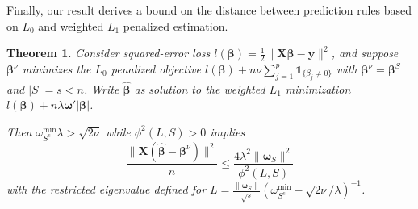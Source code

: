 \documentclass[12pt]{article}
\newtheorem{theorem}{\sc Theorem}[section]
\newcommand{\bs}[1]{\boldsymbol{#1}}
\newcommand{\mr}[1]{\mathrm{#1}}
\newcommand{\bm}[1]{\mathbf{#1}}
\newcommand{\ds}[1]{\mathds{#1}}
\begin{document}
Finally, our result derives a bound on the distance between prediction rules based on $L_0$ and weighted $L_1$ penalized estimation.
\begin{theorem} \label{sparseapprox}  Consider squared-error loss $l(\bs{\beta}) =
\frac{1}{2}\|\bm{X}\bs{\beta}-\bm{y}\|^2$, and suppose $\bs{\beta}^{\nu}$ minimizes the $L_0$ penalized objective $l(\bs{\beta}) + n\nu\sum_{j=1}^p\ds{1}_{\{\beta_j\neq0\}}$ with $\bs{\beta}^\nu = \bs{\beta}^S$ and $|S|=s<n$.   
Write $\bs{\hat\beta}$ as solution to the weighted $L_1$ minimization $l(\bs{\beta}) + n\lambda\bs{\omega}'|\bs{\beta}|$. 

Then  
$\omega^{\mr{min}}_{S^c}\lambda > \sqrt{2\nu}$ while $\phi^2(L,S) > 0$ implies
\begin{equation} \label{sparseineq}
\frac{\|\bm{X}(\bs{\hat\beta}-\bs{\beta}^\nu)\|^2}{n}\leq
\frac{4\lambda^2 \|\bs{\omega}_S\|^2}{\phi^2(L, S)}
\end{equation} 
with the restricted eigenvalue defined for 
 $L = \frac{\|\bs{\omega}_S\|}{\sqrt{s}}(\omega^{\mr{min}}_{S^c}-\sqrt{2\nu}/\lambda)^{-1}$.
\end{theorem}
\end{document}
